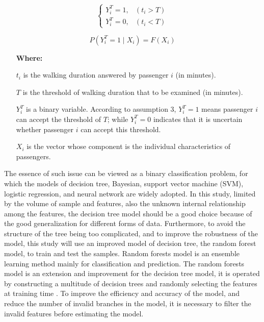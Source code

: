 \begin{equation}
    \left\{\begin{matrix}
		Y^T_i=1,&(t_i>T) \\
		Y^T_i=0,&(t_i<T)
	\end{matrix}\right.
	\label{eq:chp4:threshold}
\end{equation}

\begin{equation}
	P(Y^T_i=1 \mid X_i)=F(X_i)
	\label{eq:chp4:probability}
\end{equation}

%
\begin{enumerate}
	\item[\textbf{Where:}]
	\item[$t_i$] is the walking duration answered by passenger $i$ (in minutes).
	\item[$T$] is the threshold of walking duration that to be examined (in minutes).
	\item[$Y^T_i$] is a binary variable. According to assumption 3, $Y^T_i=1$ means passenger $i$ can accept the threshold of $T$; while $Y^T_i=0$ indicates that it is uncertain whether passenger $i$ can accept this threshold.
	\item[$X_i$] is the vector whose component is the individual characteristics of passengers.
\end{enumerate}

%
The essence of such issue can be viewed as a binary classification problem, for which the models of decision tree, Bayesian, support vector machine (SVM), logistic regression, and neural network are widely adopted. In this study, limited by the volume of sample and features, also the unknown internal relationship among the features, the decision tree model should be a good choice because of the good generalization for different forms of data. Furthermore, to avoid the structure of the tree being too complicated, and to improve the robustness of the model, this study will use an improved model of decision tree, the random forest model, to train and test the samples. Random forests model is an ensemble learning method mainly for classification and prediction. The random forests model is an extension and improvement for the decision tree model, it is operated by constructing a multitude of decision trees and randomly selecting the features at training time \cite{ho1995random,ho1998random}. To improve the efficiency and accuracy of the model, and reduce the number of invalid branches in the model, it is necessary to filter the invalid features before estimating the model.

